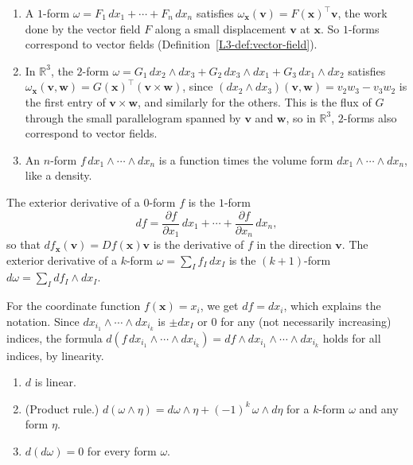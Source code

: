 \begin{example}\label{A-ex:forms}
    \begin{enumerate}
        \item A $1$-form $\omega = F_1\, dx_1 + \cdots + F_n\, dx_n$ satisfies $\omega_{\mathbf{x}}(\mathbf{v}) = F(\mathbf{x})^\top\mathbf{v}$, the work done by the vector field $F$ along a small displacement $\mathbf{v}$ at $\mathbf{x}$. So $1$-forms correspond to vector fields (Definition~\ref{L3-def:vector-field}).
        \item In $\mathbb{R}^3$, the $2$-form $\omega = G_1\, dx_2 \wedge dx_3 + G_2\, dx_3 \wedge dx_1 + G_3\, dx_1 \wedge dx_2$ satisfies $\omega_{\mathbf{x}}(\mathbf{v}, \mathbf{w}) = G(\mathbf{x})^\top(\mathbf{v} \times \mathbf{w})$, since $(dx_2 \wedge dx_3)(\mathbf{v}, \mathbf{w}) = v_2w_3 - v_3w_2$ is the first entry of $\mathbf{v} \times \mathbf{w}$, and similarly for the others. This is the flux of $G$ through the small parallelogram spanned by $\mathbf{v}$ and $\mathbf{w}$, so in $\mathbb{R}^3$, $2$-forms also correspond to vector fields.
        \item An $n$-form $f\, dx_1 \wedge \cdots \wedge dx_n$ is a function times the volume form $dx_1 \wedge \cdots \wedge dx_n$, like a density.
    \end{enumerate}
\end{example}

\begin{definition}\label{A-def:exterior-derivative}
    The exterior derivative of a $0$-form $f$ is the $1$-form
    \[df = \frac{\partial f}{\partial x_1}\, dx_1 + \cdots + \frac{\partial f}{\partial x_n}\, dx_n,\]
    so that $df_{\mathbf{x}}(\mathbf{v}) = Df(\mathbf{x})\mathbf{v}$ is the derivative of $f$ in the direction $\mathbf{v}$. The exterior derivative of a $k$-form $\omega = \sum_I f_I\, dx_I$ is the $(k + 1)$-form $d\omega = \sum_I df_I \wedge dx_I$.
\end{definition}

For the coordinate function $f(\mathbf{x}) = x_i$, we get $df = dx_i$, which explains the notation. Since $dx_{i_1} \wedge \cdots \wedge dx_{i_k}$ is $\pm dx_I$ or $0$ for any (not necessarily increasing) indices, the formula $d(f\, dx_{i_1} \wedge \cdots \wedge dx_{i_k}) = df \wedge dx_{i_1} \wedge \cdots \wedge dx_{i_k}$ holds for all indices, by linearity.

\begin{proposition}\label{A-prop:d-properties}
    \begin{enumerate}
        \item $d$ is linear.
        \item (Product rule.) $d(\omega \wedge \eta) = d\omega \wedge \eta + (-1)^k\, \omega \wedge d\eta$ for a $k$-form $\omega$ and any form $\eta$.
        \item $d(d\omega) = 0$ for every form $\omega$.
    \end{enumerate}
\end{proposition}

